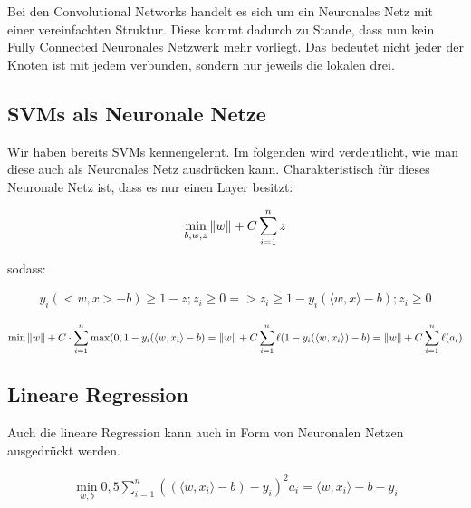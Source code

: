 Bei den Convolutional Networks handelt es sich um ein Neuronales Netz mit einer vereinfachten Struktur. Diese kommt dadurch zu Stande, dass nun kein Fully Connected Neuronales Netzwerk mehr vorliegt. Das bedeutet nicht jeder der Knoten ist mit jedem verbunden, sondern nur jeweils die lokalen drei.


\subsection{SVMs als Neuronale Netze}

Wir haben bereits SVMs kennengelernt. Im folgenden wird verdeutlicht, wie man diese auch als Neuronales Netz ausdrücken kann. Charakteristisch für dieses Neuronale Netz ist, dass es nur einen Layer besitzt:

\begin{align*}
\min\limits_{b,w,z} \left\lVert w\right\rVert + C  \sum_{i=1}^{n} z
\end {align*}

sodass:

\begin{align*}
y_i (<w,x> - b) \geq 1 - z ; z_i \geq 0 => z_i \geq 1- y_i (\langle w,x \rangle - b); z_i \geq 0
\end {align*}

\begin{align*}
\min \left\lVert w\right\rVert + C \cdot \sum_{i=1}^{n} \max (0, 1-y_i (\langle w,x_i\rangle-b) = \left\lVert w\right\rVert + C \sum_{i=1}^{n} \ell ( 1-y_i (\langle w,x_i\rangle)-b) = \left\lVert w\right\rVert + C \sum_{i=1}^{n} \ell (a_i)
\end{align*}


\subsection{Lineare Regression}

Auch die lineare Regression kann auch in Form von Neuronalen Netzen ausgedrückt werden. 

\begin{align*}
\min\limits_{w,b} 0,5 \sum_{i=1}^{n} ((\langle w,x_i\rangle- b) -y_i)^2
a_i = \langle w,x_i\rangle -b-y_i
\end{align*}

